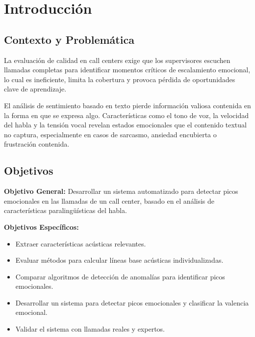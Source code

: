 \section{Introducción}

\subsection{Contexto y Problemática}

La evaluación de calidad en call centers exige que los supervisores escuchen llamadas
completas para identificar momentos críticos de escalamiento emocional, lo cual es
ineficiente, limita la cobertura y provoca pérdida de oportunidades clave de
aprendizaje.

El análisis de sentimiento basado en texto pierde información valiosa contenida en la
forma en que se expresa algo. Características como el tono de voz, la velocidad del
habla y la tensión vocal revelan estados emocionales que el contenido textual no
captura, especialmente en casos de sarcasmo, ansiedad encubierta o frustración
contenida.

\subsection{Objetivos}

\textbf{Objetivo General:} Desarrollar un sistema automatizado para detectar picos
emocionales en las llamadas de un call center, basado en el análisis de características
paralingüísticas del habla.

\textbf{Objetivos Específicos:}
\begin{itemize}
    \item Extraer características acústicas relevantes.
    \item Evaluar métodos para calcular líneas base acústicas individualizadas.
    \item Comparar algoritmos de detección de anomalías para identificar picos
          emocionales.
    \item Desarrollar un sistema para detectar picos emocionales y clasificar la
          valencia emocional.
    \item Validar el sistema con llamadas reales y expertos.
\end{itemize}

